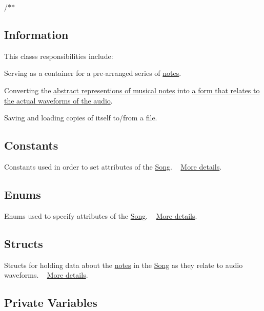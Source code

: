 /$\ast$$\ast$\hypertarget{group___doc_song_DocSongInfo}{}\subsection{Information}\label{group___doc_song_DocSongInfo}
This class\textquotesingle{}s responsibilities include\+: \begin{DoxyItemize}
\item Serving as a container for a pre-\/arranged series of \hyperlink{group___music_structs_struct_music_1_1_combined_note}{notes}. \item Converting the \hyperlink{group___music_structs_struct_music_1_1_combined_note}{abstract representions of musical notes} into \hyperlink{group___song_structs_struct_song_1_1_combined_note_data}{a form that relates to the actual waveforms of the audio}. \item Saving and loading copies of itself to/from a file.\end{DoxyItemize}
\hypertarget{group___doc_song_DocSongConst}{}\subsection{Constants}\label{group___doc_song_DocSongConst}
Constants used in order to set attributes of the \hyperlink{class_song}{Song}. ~\newline
 \hyperlink{group___song_const}{More details}.\hypertarget{group___doc_song_DocSongEnums}{}\subsection{Enums}\label{group___doc_song_DocSongEnums}
Enums used to specify attributes of the \hyperlink{class_song}{Song}. ~\newline
 \hyperlink{group___song_enums}{More details}.\hypertarget{group___doc_song_DocSongStructs}{}\subsection{Structs}\label{group___doc_song_DocSongStructs}
Structs for holding data about the \hyperlink{group___music_structs_struct_music_1_1_combined_note}{notes} in the \hyperlink{class_song}{Song} as they relate to audio waveforms. ~\newline
 \hyperlink{group___song_structs}{More details}.\hypertarget{group___doc_song_DocSongPrivVar}{}\subsection{Private Variables}\label{group___doc_song_DocSongPrivVar}
$$
